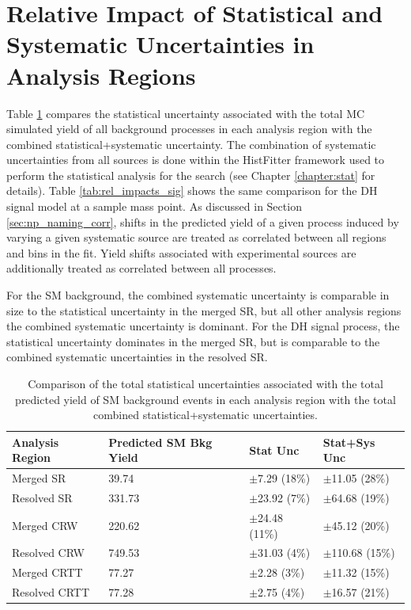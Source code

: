 \section{Relative Impact of Statistical and Systematic Uncertainties in Analysis Regions}

Table \ref{tab:rel_impacts_bkg} compares the statistical uncertainty associated with the total MC simulated yield of all background processes in each analysis region with the combined statistical+systematic uncertainty. The combination of systematic uncertainties from all sources is done within the HistFitter framework used to perform the statistical analysis for the search (see Chapter \ref{chapter:stat} for details). Table \ref{tab:rel_impacts_sig} shows the same comparison for the DH signal model at a sample mass point. As discussed in Section \ref{sec:np_naming_corr}, shifts in the predicted yield of a given process induced by varying a given systematic source are treated as correlated between all regions and bins in the fit. Yield shifts associated with experimental sources are additionally treated as correlated between all processes. 

For the SM background, the combined systematic uncertainty is comparable in size to the statistical uncertainty in the merged SR, but all other analysis regions the combined systematic uncertainty is dominant. For the DH signal process, the statistical uncertainty dominates in the merged SR, but is comparable to the combined systematic uncertainties in the resolved SR.

\begin{table}[ht]
\begin{center}
\caption{\label{tab:rel_impacts_bkg} Comparison of the total statistical uncertainties associated with the total predicted yield of SM background events in each analysis region with the total combined statistical+systematic uncertainties.}
\begin{tabular}{l l l l }
\toprule
\textbf{Analysis Region}& \textbf{Predicted SM Bkg Yield} & \textbf{Stat Unc} & \textbf{Stat+Sys Unc} \tabularnewline
\midrule
\midrule
Merged SR & 39.74 & \(\pm\)7.29 (18\%) & \(\pm\)11.05 (28\%) \tabularnewline
\midrule
Resolved SR & 331.73 & \(\pm\)23.92 (7\%) & \(\pm\)64.68 (19\%) \tabularnewline
\midrule
Merged CRW & 220.62 & \(\pm\)24.48 (11\%) & \(\pm\)45.12 (20\%) \tabularnewline
\midrule
Resolved CRW & 749.53 & \(\pm\)31.03 (4\%) & \(\pm\)110.68 (15\%) \tabularnewline
\midrule
Merged CRTT & 77.27 & \(\pm\)2.28 (3\%) & \(\pm\)11.32 (15\%) \tabularnewline
\midrule
Resolved CRTT & 77.28 & \(\pm\)2.75 (4\%) & \(\pm\)16.57 (21\%) \tabularnewline
\bottomrule
\end{tabular}
\end{center}
\end{table}

